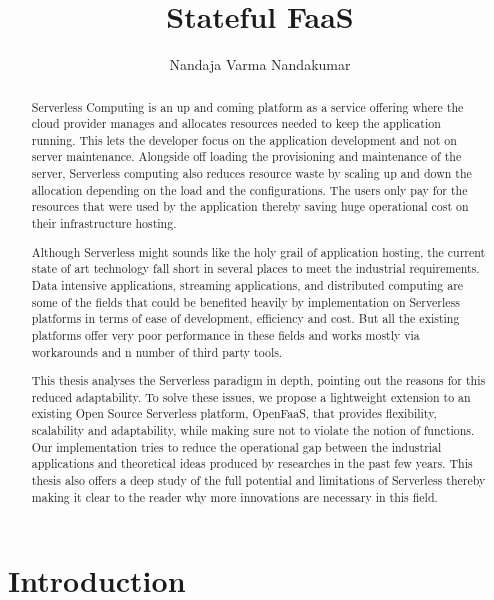\documentclass[12pt,titlepage]{article}
\author{Nandaja Varma Nandakumar}
\date{}
\title{Stateful FaaS}
\begin{document}
\maketitle
\begin{abstract}
Serverless Computing is an up and coming platform as a service offering 
where the cloud provider manages and allocates
resources needed to keep the application running. This lets the developer focus on the application development
and not on server maintenance. Alongside off loading the provisioning and
maintenance of the server, Serverless computing also reduces resource waste
by scaling up and down the allocation depending on the load and the
configurations. The users only pay for the resources that were used by the
application thereby saving huge operational cost on their infrastructure
hosting.

Although Serverless might sounds like the holy grail of application hosting, the 
current state of art technology fall short in several places to meet the industrial
requirements. Data intensive applications, streaming applications, and
distributed computing are some of the fields that could be benefited heavily by
implementation on Serverless platforms in terms of ease of development,
efficiency and cost. But all the existing platforms offer very
poor performance in these fields and works mostly via workarounds and n number
of third party tools.

This thesis analyses the Serverless paradigm in depth,
pointing out the reasons for this reduced adaptability. To solve these issues, we propose a lightweight
extension to an existing Open Source Serverless platform, OpenFaaS, that provides
flexibility, scalability and adaptability, while making sure not to violate the notion
of functions. Our implementation tries to reduce the operational gap between the
industrial applications and theoretical ideas produced by researches in the past few years.
This thesis also offers a deep study of the full potential and limitations of
Serverless thereby making it clear to the reader why more innovations are
necessary in this field.

\end{abstract}

\setcounter{tocdepth}{5}
\tableofcontents


\section{Introduction}
\label{sec:org2c9e33d}
\end{document}
